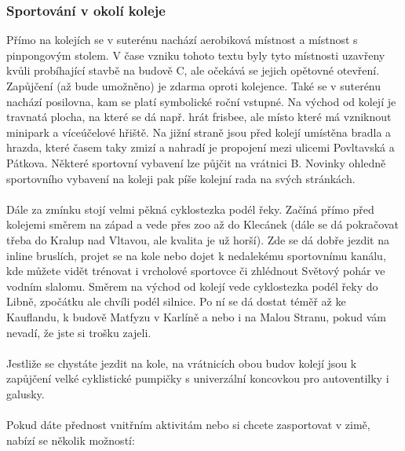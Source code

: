 \subsubsection{Sportování v okolí koleje}
Přímo na kolejích se v suterénu nachází aerobiková místnost a místnost s
pinpongovým stolem. V čase vzniku tohoto textu byly tyto místnosti uzavřeny
kvůli probíhající stavbě na budově C, ale očekává se jejich opětovné otevření.
Zapůjčení (až bude umožněno) je zdarma oproti kolejence. Také se v suterénu
nachází posilovna, kam se platí symbolické roční vstupné. Na východ od kolejí je
travnatá plocha, na které se dá např. hrát frisbee, ale místo které má vzniknout
minipark a víceúčelové hřiště. Na jižní straně jsou před kolejí umístěna bradla
a hrazda, které časem taky zmizí a nahradí je propojení mezi ulicemi Povltavská
a Pátkova. Některé sportovní vybavení lze půjčit na vrátnici B. Novinky ohledně
sportovního vybavení na koleji pak píše kolejní rada na svých stránkách.
\\\\
Dále za zmínku stojí velmi pěkná cyklostezka podél řeky. Začíná přímo před
kolejemi směrem na západ a vede přes zoo až do Klecánek (dále se dá pokračovat
třeba do Kralup nad Vltavou, ale kvalita je už horší). Zde se dá dobře jezdit na
inline bruslích, projet se na kole nebo dojet k nedalekému sportovnímu kanálu,
kde můžete vidět trénovat i vrcholové sportovce či zhlédnout Světový pohár ve
vodním slalomu. Směrem na východ od kolejí vede cyklostezka podél řeky do Libně,
zpočátku ale chvíli podél silnice. Po ní se dá dostat téměř až ke Kauflandu, k
budově Matfyzu v Karlíně a nebo i na Malou Stranu, pokud vám nevadí, že jste si
trošku zajeli.
\\\\
Jestliže se chystáte jezdit na kole, na vrátnicích obou budov kolejí jsou k
zapůjčení velké cyklistické pumpičky s univerzální koncovkou pro autoventilky i
galusky.
\\\\
Pokud dáte přednost vnitřním aktivitám nebo si chcete zasportovat v zimě, nabízí
se několik možností:
